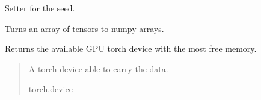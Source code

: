 \documentclass[letterpaper,10pt,english]{sphinxmanual}
\begin{document}
\begin{fulllineitems}

\begin{fulllineitems}
\label{\detokenize{MLSCAlib.Data:MLSCAlib.Data.data_manager.DataManager.set_seed}}
\pysigstartsignatures
{}
\pysigstopsignatures
\sphinxAtStartPar
Setter for the seed.

\end{fulllineitems}


\begin{fulllineitems}
\label{\detokenize{MLSCAlib.Data:MLSCAlib.Data.data_manager.DataManager.tensor_to_numpy}}
\pysigstartsignatures
{}
\pysigstopsignatures
\sphinxAtStartPar
Turns an array of tensors to numpy arrays.

\end{fulllineitems}


\end{fulllineitems}


\begin{fulllineitems}
\label{\detokenize{MLSCAlib.Data:MLSCAlib.Data.data_manager.get_a_free_gpu}}
\pysigstartsignatures
{}
\pysigstopsignatures
\sphinxAtStartPar
Returns the available GPU torch device with the most free memory.
\begin{quote}\begin{description}
\sphinxAtStartPar
A torch device able to carry the data.

\sphinxAtStartPar
torch.device

\end{description}\end{quote}

\end{fulllineitems}
\end{document}
